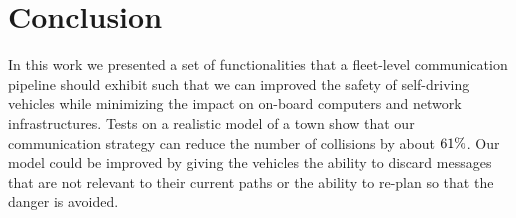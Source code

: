 \section{Conclusion}
In this work we presented a set of functionalities that a fleet-level communication pipeline should exhibit
such that we can improved the safety of self-driving vehicles while minimizing the impact on on-board computers
and network infrastructures.
Tests on a realistic model of a town show that our communication strategy can reduce the number of
collisions by about $\collision_ratio_reduction_perc\%$.
Our model could be improved by giving the vehicles the ability to discard messages that are not relevant
to their current paths or the ability to re-plan so that the danger is avoided.